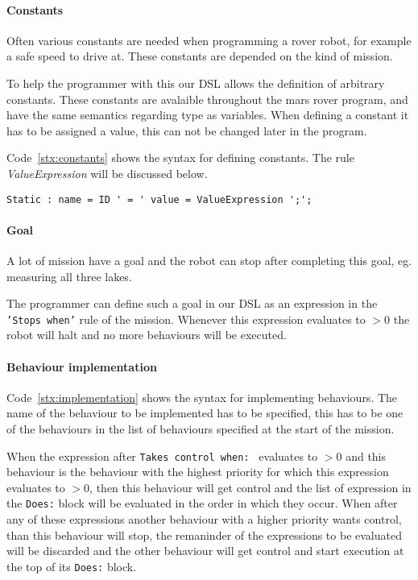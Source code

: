 \paragraph{Constants} Often various constants are needed when programming a
rover robot, for example a safe speed to drive at. These constants 
are depended on the kind of mission. 

To help the programmer with this our DSL
allows the definition of arbitrary constants. These constants are avalaible
throughout the mars rover program, and have the same semantics regarding type
as variables. When defining a constant it has to be assigned a value, this can 
not be changed later in the program. 

Code~\ref{stx:constants} shows the syntax for defining constants. The rule
\emph{ValueExpression} will be discussed below.

\begin{lstlisting}[caption=Syntax for defining constants, label=stx:constants]
Static : name = ID ' = ' value = ValueExpression ';';
\end{lstlisting}

\paragraph{Goal} A lot of mission have a goal and the robot can stop after 
completing this goal, eg. measuring all three lakes. 

The programmer can define such a goal in our DSL as an expression in the
\texttt{'Stops when'} rule of the mission. Whenever this expression evaluates to
$>0$ the robot will halt and no more behaviours will be executed.

\paragraph{Behaviour implementation}
Code~\ref{stx:implementation} shows the syntax for implementing behaviours. 
The name of the behaviour to be implemented has to be specified, this has to be
one of the behaviours in the list of behaviours specified at the start of the 
mission. 

When the expression after \texttt{Takes control when: } evaluates to $>0$
and this behaviour is the behaviour with the highest priority for which this
expression evaluates to $>0$, then this behaviour will get control and the 
list of expression in the \texttt{Does:} block will be evaluated in the order
in which they occur. When after any of these expressions another behaviour with
a higher priority wants control, than this behaviour will stop, the remaninder 
of the expressions to be evaluated will be discarded and the other behaviour
will get control and start execution at the top of its \texttt{Does:} block.

